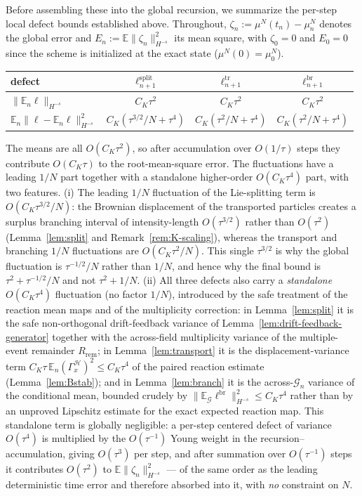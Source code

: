 \documentclass[a4paper,fleqn]{cas-sc}
\theoremstyle{definition}
\theoremstyle{remark}
\begin{document}
Before assembling these into the global recursion, we summarize the per-step local
defect bounds established above. Throughout, $\zeta_n:=\mu^N(t_n)-\mu^N_n$ denotes the
global error and $E_n:=\mathbb E\|\zeta_n\|_{H^{-s}}^2$ its mean square, with $\zeta_0=0$
and $E_0=0$ since the scheme is initialized at the exact state ($\mu^N(0)=\mu^N_0$).
\begin{center}
\renewcommand{\arraystretch}{1.4}
\begin{tabular}{lccc}
\hline
defect & $\ell^{\mathrm{split}}_{n+1}$ & $\ell^{\mathrm{tr}}_{n+1}$ & $\ell^{\mathrm{br}}_{n+1}$\\
\hline
$\|\mathbb E_n\ell\|_{H^{-s}}$ & $C_K\tau^2$ & $C_K\tau^2$ & $C_K\tau^2$\\
$\mathbb E_n\|\ell-\mathbb E_n\ell\|_{H^{-s}}^2$ & $C_K(\tau^{3/2}/N+\tau^4)$ & $C_K(\tau^2/N+\tau^4)$ & $C_K(\tau^2/N+\tau^4)$\\
\hline
\end{tabular}
\end{center}
The means are all $O(C_K\tau^2)$, so after accumulation over $O(1/\tau)$ steps they
contribute $O(C_K\tau)$ to the root-mean-square error. The fluctuations have a leading
$1/N$ part together with a standalone higher-order $O(C_K\tau^4)$ part, with two
features. (i) The leading $1/N$ fluctuation of the Lie-splitting term is
$O(C_K\tau^{3/2}/N)$: the Brownian displacement of the transported particles creates a
surplus branching interval of intensity-length $O(\tau^{3/2})$ rather than $O(\tau^2)$
(Lemma~\ref{lem:split} and Remark~\ref{rem:K-scaling}), whereas the transport and
branching $1/N$ fluctuations are $O(C_K\tau^2/N)$. This single $\tau^{3/2}$ is
why the global fluctuation is $\tau^{-1/2}/N$ rather than $1/N$, and hence why the
final bound is $\tau^2+\tau^{-1/2}/N$ and not $\tau^2+1/N$. (ii) All three defects also
carry a \emph{standalone} $O(C_K\tau^4)$ fluctuation (no factor $1/N$), introduced by
the safe treatment of the reaction mean maps and of the multiplicity correction: in
Lemma~\ref{lem:split} it is the safe non-orthogonal drift-feedback variance of
Lemma~\ref{lem:drift-feedback-generator} together with the across-field
multiplicity variance of the multiple-event remainder $R_{\mathrm{rem}}$; in Lemma~\ref{lem:transport} it is the
displacement-variance term $C_K\tau\,\mathbb E_n(\Gamma_x^{\mathcal H})^2\le C_K\tau^4$
of the paired reaction estimate (Lemma~\ref{lem:Bstab}); and in
Lemma~\ref{lem:branch} it is the across-$\mathcal G_n$ variance of the conditional
mean, bounded crudely by $\|\mathbb E_{\mathcal G}\ell^{\mathrm{br}}\|_{H^{-s}}^2\le C_K\tau^4$
rather than by an unproved Lipschitz estimate for the exact expected reaction map.
This standalone term is globally negligible: a per-step centered defect of variance
$O(\tau^4)$ is multiplied by the $O(\tau^{-1})$ Young weight in the
recursion--accumulation, giving $O(\tau^3)$ per step, and after summation over
$O(\tau^{-1})$ steps it contributes $O(\tau^2)$ to $\mathbb E\|\zeta_n\|_{H^{-s}}^2$ ---
of the same order as the leading deterministic time error and therefore absorbed into
it, with \emph{no} constraint on $N$.
\end{document}
